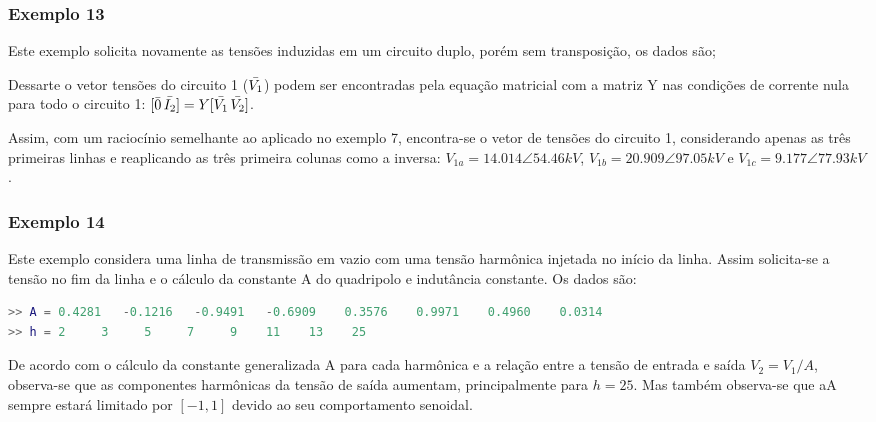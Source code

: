 \subsubsection*{Exemplo 13}

Este exemplo solicita novamente as tensões induzidas em um circuito duplo, porém sem transposição, os dados são;



Dessarte o vetor tensões do circuito 1 ($\Bar{V_1}$) podem ser encontradas pela equação matricial com a matriz Y nas condições de corrente nula para todo o circuito 1: $[\Bar{0} \, \Bar{I_2}] = Y [\Bar{V_1} \, \Bar{V_2}]$. 

Assim, com um raciocínio semelhante ao aplicado no exemplo 7, encontra-se o vetor de tensões do circuito 1, considerando apenas as três primeiras linhas e reaplicando as três primeira colunas como a inversa: $V_{1a} = 14.014 \angle 54.46 kV$, $V_{1b} = 20.909 \angle 97.05 kV$ e $V_{1c} = 9.177 \angle 77.93 kV$.




\subsubsection*{Exemplo 14}

Este exemplo considera uma linha de transmissão em vazio com uma tensão harmônica injetada no início da linha. Assim solicita-se a tensão no fim da linha e o cálculo da constante A do quadripolo e indutância constante. Os dados são:



\begin{lstlisting}[language=Matlab,style=consolestyle]
>> A = 0.4281   -0.1216   -0.9491   -0.6909    0.3576    0.9971    0.4960    0.0314
>> h = 2     3     5     7     9    11    13    25
\end{lstlisting}

De acordo com o cálculo da constante generalizada A para cada harmônica e a relação entre a tensão de entrada e saída $V_2=V_1/A$, observa-se que as componentes harmônicas da tensão de saída aumentam, principalmente para $h=25$. Mas também observa-se que aA sempre estará limitado por $[-1,1]$ devido ao seu comportamento senoidal.

